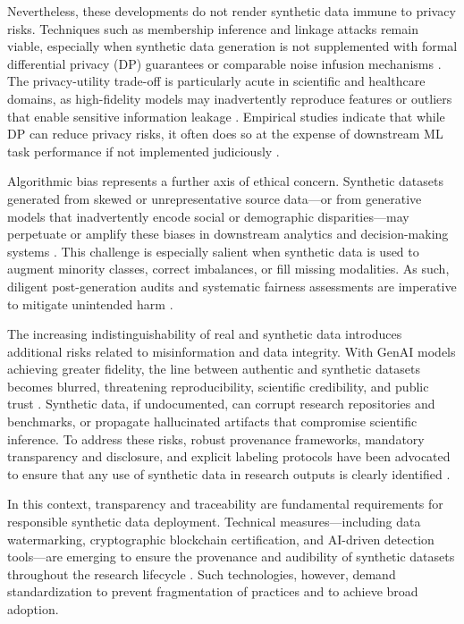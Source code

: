Nevertheless, these developments do not render synthetic data immune to privacy risks. Techniques such as membership inference and linkage attacks remain viable, especially when synthetic data generation is not supplemented with formal differential privacy (DP) guarantees or comparable noise infusion mechanisms \cite{ref12}\cite{ref14}\cite{ref16}. The privacy-utility trade-off is particularly acute in scientific and healthcare domains, as high-fidelity models may inadvertently reproduce features or outliers that enable sensitive information leakage \cite{ref8}\cite{ref12}\cite{ref18}. Empirical studies indicate that while DP can reduce privacy risks, it often does so at the expense of downstream ML task performance if not implemented judiciously \cite{ref12}\cite{ref16}.

Algorithmic bias represents a further axis of ethical concern. Synthetic datasets generated from skewed or unrepresentative source data—or from generative models that inadvertently encode social or demographic disparities—may perpetuate or amplify these biases in downstream analytics and decision-making systems \cite{ref7}\cite{ref8}\cite{ref14}\cite{ref21}\cite{ref82}. This challenge is especially salient when synthetic data is used to augment minority classes, correct imbalances, or fill missing modalities. As such, diligent post-generation audits and systematic fairness assessments are imperative to mitigate unintended harm \cite{ref6}\cite{ref7}\cite{ref82}.

The increasing indistinguishability of real and synthetic data introduces additional risks related to misinformation and data integrity. With GenAI models achieving greater fidelity, the line between authentic and synthetic datasets becomes blurred, threatening reproducibility, scientific credibility, and public trust \cite{ref5}\cite{ref9}\cite{ref21}\cite{ref60}. Synthetic data, if undocumented, can corrupt research repositories and benchmarks, or propagate hallucinated artifacts that compromise scientific inference. To address these risks, robust provenance frameworks, mandatory transparency and disclosure, and explicit labeling protocols have been advocated to ensure that any use of synthetic data in research outputs is clearly identified \cite{ref5}\cite{ref21}.

In this context, transparency and traceability are fundamental requirements for responsible synthetic data deployment. Technical measures—including data watermarking, cryptographic blockchain certification, and AI-driven detection tools—are emerging to ensure the provenance and audibility of synthetic datasets throughout the research lifecycle \cite{ref5}\cite{ref21}\cite{ref60}. Such technologies, however, demand standardization to prevent fragmentation of practices and to achieve broad adoption.

